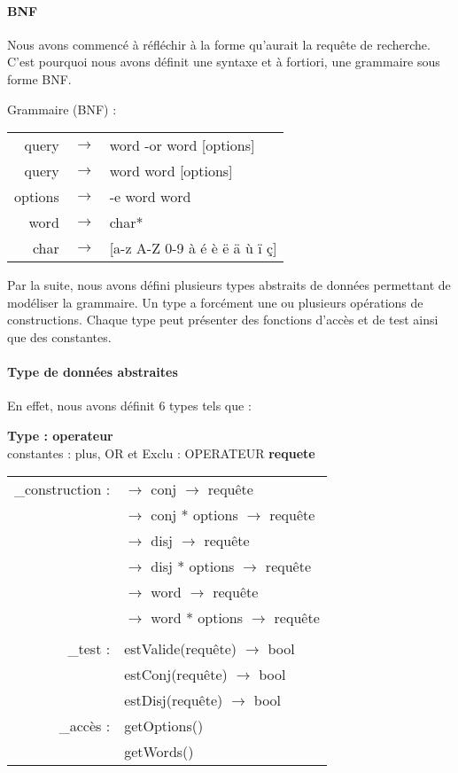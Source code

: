 \paragraph{BNF}
Nous avons commencé à réfléchir à la forme qu'aurait la requête de recherche. 
C'est pourquoi nous avons définit une syntaxe et à fortiori, une grammaire sous forme BNF.

Grammaire (BNF) :\\
\begin{tabular}{r c l}
query &$\rightarrow$ & word { -or word } [options]\\
query &$\rightarrow$ & word { word } [options] \\
	 
options&$\rightarrow$ &-e word {word}\\
word   &$\rightarrow$ &char*\\
char   &$\rightarrow$ & [a-z A-Z 0-9 à é è ë ä ù ï ç]\\ 
\end{tabular}

Par la suite, nous avons défini plusieurs types abstraits de données permettant de modéliser la grammaire.
Un type a forcément une ou plusieurs opérations de constructions. 
Chaque type peut présenter des fonctions d'accès et de test ainsi que des constantes.

\paragraph{Type de données abstraites}
En effet, nous avons définit 6 types tels que :

\textbf{Type : operateur}\\
       constantes : plus, OR et Exclu : OPERATEUR
\textbf{requete}\\
\begin{tabular}{r l}
_construction :&  $\rightarrow$ conj $\rightarrow$ requête\\
& $\rightarrow$ conj * options $\rightarrow$ requête\\
& $\rightarrow$ disj $\rightarrow$ requête\\
& $\rightarrow$ disj * options $\rightarrow$ requête\\
& $\rightarrow$ word $\rightarrow$ requête\\
& $\rightarrow$ word * options $\rightarrow$ requête\\ 
& \\
_test :& estValide(requête) $\rightarrow$ bool\\
& estConj(requête) $\rightarrow$ bool\\
& estDisj(requête) $\rightarrow$ bool\\
_accès :& getOptions()\\
	& getWords()\\
\end{tabular}

